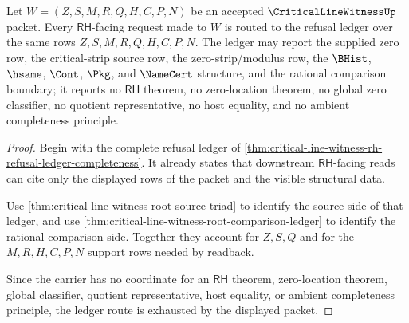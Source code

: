 \begin{theorem}
\label{thm:critical-line-witness-rh-refusal-ledger}
Let $W=(Z,S,M,R,Q,H,C,P,N)$ be an accepted $\CriticalLineWitnessUp$ packet. Every $\mathsf{RH}$-facing request made to $W$ is routed to the refusal ledger over the same rows $Z,S,M,R,Q,H,C,P,N$. The ledger may report the supplied zero row, the critical-strip source row, the zero-strip/modulus row, the $\BHist$, $\hsame$, $\Cont$, $\Pkg$, and $\NameCert$ structure, and the rational comparison boundary; it reports no $\mathsf{RH}$ theorem, no zero-location theorem, no global zero classifier, no quotient representative, no host equality, and no ambient completeness principle.
\end{theorem}
\begin{proof}
Begin with the complete refusal ledger of \autoref{thm:critical-line-witness-rh-refusal-ledger-completeness}. It already states that downstream $\mathsf{RH}$-facing reads can cite only the displayed rows of the packet and the visible structural data.

Use \autoref{thm:critical-line-witness-root-source-triad} to identify the source side of that ledger, and use \autoref{thm:critical-line-witness-root-comparison-ledger} to identify the rational comparison side. Together they account for $Z,S,Q$ and for the $M,R,H,C,P,N$ support rows needed by readback.

Since the carrier has no coordinate for an $\mathsf{RH}$ theorem, zero-location theorem, global classifier, quotient representative, host equality, or ambient completeness principle, the ledger route is exhausted by the displayed packet.
\end{proof}
